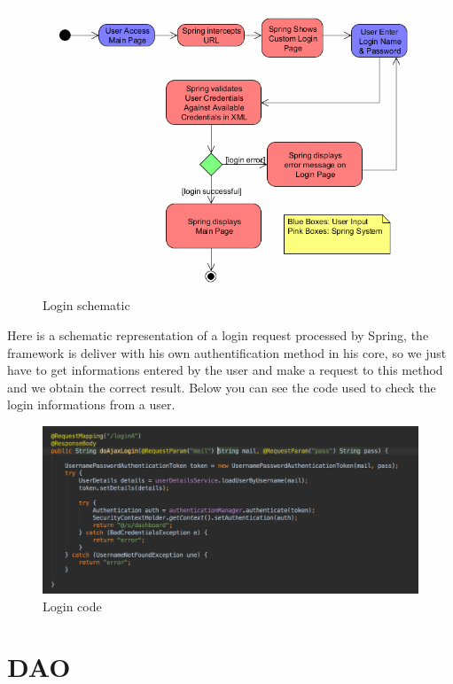\begin{figure}[H]
  \caption{Login schematic}
  \centering
    \includegraphics[width=1\textwidth]{img/login.png}
\end{figure}


Here is a schematic representation of a login request processed by Spring, the framework is deliver with his own authentification method in his core, so we just have to get informations entered by the user and make a request to this method and we obtain the correct result. Below you can see the code used to check the login informations from a user.

\begin{figure}[H]
  \caption{Login code}
  \centering
    \includegraphics[width=1\textwidth]{img/loginCode.png}
\end{figure}




\section{DAO}
